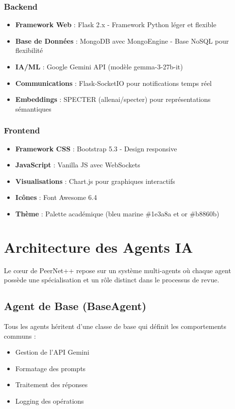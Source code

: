 \documentclass[12pt,a4paper]{article}
\begin{document}
\subsubsection{Backend}
\begin{itemize}
    \item \textbf{Framework Web} : Flask 2.x - Framework Python léger et flexible
    \item \textbf{Base de Données} : MongoDB avec MongoEngine - Base NoSQL pour flexibilité
    \item \textbf{IA/ML} : Google Gemini API (modèle gemma-3-27b-it)
    \item \textbf{Communications} : Flask-SocketIO pour notifications temps réel
    \item \textbf{Embeddings} : SPECTER (allenai/specter) pour représentations sémantiques
\end{itemize}

\subsubsection{Frontend}
\begin{itemize}
    \item \textbf{Framework CSS} : Bootstrap 5.3 - Design responsive
    \item \textbf{JavaScript} : Vanilla JS avec WebSockets
    \item \textbf{Visualisations} : Chart.js pour graphiques interactifs
    \item \textbf{Icônes} : Font Awesome 6.4
    \item \textbf{Thème} : Palette académique (bleu marine \#1e3a8a et or \#b8860b)
\end{itemize}

\section{Architecture des Agents IA}

Le cœur de PeerNet++ repose sur un système multi-agents où chaque agent possède une spécialisation et un rôle distinct dans le processus de revue.

\subsection{Agent de Base (BaseAgent)}

Tous les agents héritent d'une classe de base qui définit les comportements communs :
\begin{itemize}
    \item Gestion de l'API Gemini
    \item Formatage des prompts
    \item Traitement des réponses
    \item Logging des opérations
\end{itemize}
\end{document}

